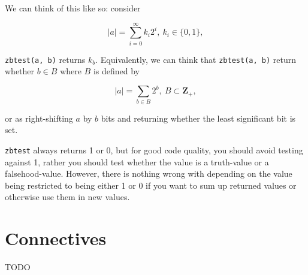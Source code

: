 We can think of this like so: consider

$$ \lvert a \rvert = \sum_{i = 0}^\infty k_i 2^i,~ k_i \in \{0, 1\}, $$

\noindent
{\tt zbtest(a, b)} returns $k_b$. Equivalently, we can think
that {\tt zbtest(a, b)} return whether $b \in B$ where $B$
is defined by

$$ \lvert a \rvert = \sum_{b \in B} 2^b,~ B \subset \textbf{Z}_+, $$

\noindent
or as right-shifting $a$ by $b$ bits and returning whether the
least significant bit is set.

{\tt zbtest} always returns 1 or 0, but for good code quality, you
should avoid testing against 1, rather you should test whether the
value is a truth-value or a falsehood-value. However, there is
nothing wrong with depending on the value being restricted to being
either 1 or 0 if you want to sum up returned values or otherwise
use them in new values.


\newpage
\section{Connectives}
\label{sec:Connectives}

TODO %
